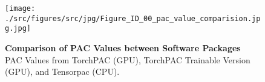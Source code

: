         \clearpage
        \begin{figure}[ht]
        	\centering
            \texttt{[image: ./src/figures/src/jpg/Figure\_ID\_00\_pac\_value\_comparision.jpg.jpg]}

\caption{\textbf{
Comparison of PAC Values between Software Packages
}
\smallskip
\\
PAC Values from TorchPAC (GPU), TorchPAC Trainable Version (GPU), and Tensorpac (CPU).
}
        	\label{fig:00_pac_value_comparision}
        \end{figure}
